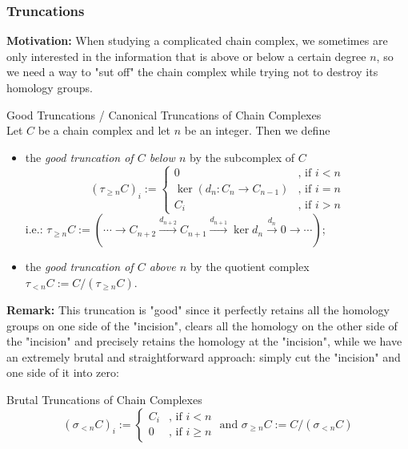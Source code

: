 \subsubsection{Truncations}

\noindent\textbf{Motivation:} When studying a complicated chain complex, we sometimes are only interested in the information that is above or below a certain degree $n$, so we need a way to "sut off" the chain complex while trying not to destroy its homology groups.

\begin{definition}{Good Truncations / Canonical Truncations of Chain Complexes}\\
Let $C$ be a chain complex and let $n$ be an integer. Then we define
\begin{itemize}
    \item the \textit{good truncation of $C$ below $n$} by the subcomplex of $C$
    \[
    (\tau_{\geq n}C)_i := \begin{cases}
        0 &\text{, if } i<n\\
        \ker (d_n: C_n \to C_{n-1}) &\text{, if } i=n\\
        C_i &\text{, if } i>n
    \end{cases}
    \]
    i.e.: $\tau_{\geq n}C := (\cdots \to C_{n+2} \xrightarrow{d_{n+2}} C_{n+1} \xrightarrow{d_{n+1}} \ker d_n \xrightarrow{d_n}0 \to \cdots)$;
    \item the \textit{good truncation of $C$ above $n$} by the quotient complex $\tau_{<n}C:= C/ (\tau_{\geq n}C)$.
\end{itemize}
\end{definition}

\noindent\textbf{Remark:} This truncation is "good" since it perfectly retains all the homology groups on one side of the "incision", clears all the homology on the other side of the "incision" and precisely retains the homology at the "incision", while we have an extremely brutal and straightforward approach: simply cut the "incision" and one side of it into zero:

\begin{definition}{Brutal Truncations of Chain Complexes}
\[
(\sigma_{<n} C)_i:= \begin{cases}
    C_i &\text{, if }i<n\\
    0 &\text{, if }i\geq n
\end{cases}
\text{ and } \sigma_{\geq n}C:= C/(\sigma_{<n}C)
\]
\end{definition}


